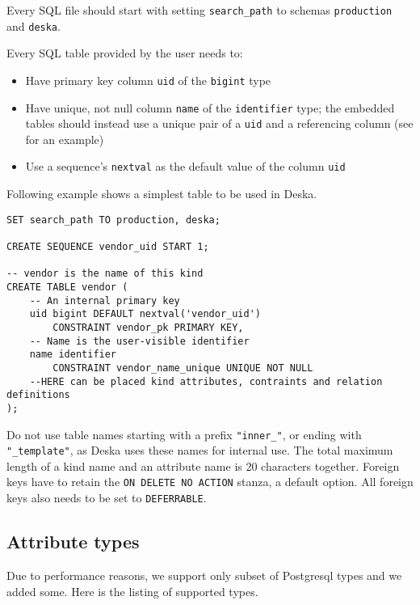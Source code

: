 \documentclass[deska]{subfiles}
\begin{document}
Every SQL file should start with
setting {\tt search\_path} to schemas {\tt production} and {\tt deska}.

Every SQL table provided by the user needs to:
\begin{itemize}
    \item Have primary key column {\tt uid} of the {\tt bigint} type
    \item Have unique, not null column {\tt name} of the {\tt identifier} type; the embedded tables should instead use a
        unique pair of a {\tt uid} and a referencing column (see  for an example)
    \item Use a sequence's {\tt nextval} as the default value of the column {\tt uid}
\end{itemize}

Following example shows a simplest table to be used in Deska.

\begin{verbatim}
SET search_path TO production, deska;

CREATE SEQUENCE vendor_uid START 1;

-- vendor is the name of this kind
CREATE TABLE vendor (
    -- An internal primary key
    uid bigint DEFAULT nextval('vendor_uid')
        CONSTRAINT vendor_pk PRIMARY KEY,
    -- Name is the user-visible identifier
    name identifier
        CONSTRAINT vendor_name_unique UNIQUE NOT NULL
    --HERE can be placed kind attributes, contraints and relation definitions
);
\end{verbatim}

Do not use table names starting with a prefix {\tt "inner\_"}, or ending with {\tt "\_template"}, as
Deska uses these names for internal use.  The total maximum length of a kind name and an attribute name is 20 characters
together.  Foreign keys have to retain the {\tt ON DELETE NO ACTION} stanza, a default option. All foreign keys also
needs to be set to {\tt DEFERRABLE}.

\subsection{Attribute types}
\label{sec:db-att-types}
Due to performance reasons, we support only subset of Postgresql types and we added some.
Here is the listing of supported types.
\end{document}
